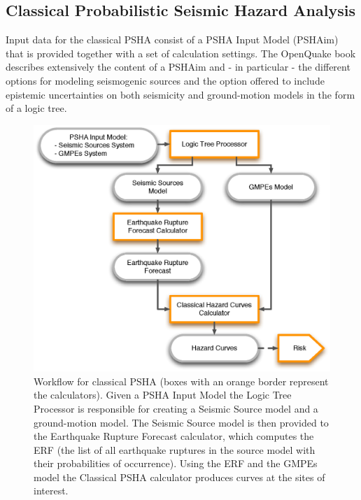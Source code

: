 \subsection{Classical Probabilistic Seismic Hazard Analysis}
\label{section:classicalPSHA}
%
Input data for the classical PSHA consist of a PSHA Input Model (PSHAim) that 
is provided together with a set of calculation settings. 
%
The OpenQuake book \citep{crowley2011} describes extensively the content of a PSHAim and 
- in particular - the different options for modeling seismogenic sources 
and the option offered to include epistemic uncertainties on both seismicity 
and ground-motion models in the form of a logic tree.
%
\begin{figure}[htbp]
\begin{center}
\includegraphics[width=14cm]{./figures/classical_psha_workflow.eps}
\caption{Workflow for classical PSHA (boxes with an orange border represent the 
calculators). Given a PSHA Input Model 
the Logic Tree Processor is responsible for creating a Seismic Source model
and a ground-motion model. 
The Seismic Source model is then provided to the Earthquake Rupture Forecast 
calculator, which computes the ERF (the list of all earthquake ruptures in the 
source model with their probabilities of occurrence). 
Using the ERF and the GMPEs model the Classical PSHA calculator produces 
curves at the sites of interest.}
\label{classical_psha_workflow}
\end{center}
\end{figure}

